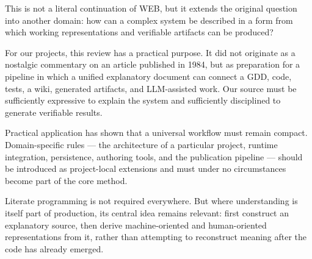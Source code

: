 \documentclass{ZGJournalArticle_2026}
\begin{document}
This is not a literal continuation of WEB, but it extends the original
question into another domain: how can a complex system be described in a
form from which working representations and verifiable artifacts can be
produced?

For our projects, this review has a practical purpose. It did not
originate as a nostalgic commentary on an article published in 1984, but
as preparation for a pipeline in which a unified explanatory document
can connect a GDD, code, tests, a wiki, generated artifacts, and
LLM-assisted work. Our source must be sufficiently expressive to explain
the system and sufficiently disciplined to generate verifiable results.

Practical application has shown that a universal workflow must remain
compact. Domain-specific rules --- the architecture of a particular
project, runtime integration, persistence, authoring tools, and the
publication pipeline --- should be introduced as project-local
extensions and must under no circumstances become part of the core
method.

Literate programming is not required everywhere. But where understanding
is itself part of production, its central idea remains relevant: first
construct an explanatory source, then derive machine-oriented and
human-oriented representations from it, rather than attempting to
reconstruct meaning after the code has already emerged.

\protect{}\label{refs}
\end{document}
